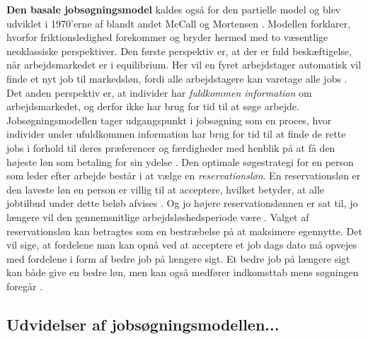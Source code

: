 \textbf{Den basale jobsøgningsmodel} kaldes også for den partielle model og blev udviklet i 1970'erne af blandt andet McCall og Mortensen \parencite[109]{Cahuc2004}. Modellen forklarer, hvorfor friktionsledighed forekommer og bryder hermed med to væsentlige neoklassiske perspektiver. Den første perspektiv er, at der er fuld beskæftigelse, når arbejdsmarkedet er i equilibrium. Her vil en fyret arbejdstager automatisk vil finde et nyt job til markedsløn, fordi alle arbejdstagere kan varetage alle jobs \parencite[163]{Mankiw2007}. Det anden perspektiv er, at individer har \textit{fuldkommen information} om arbejdsmarkedet, og derfor ikke har brug for tid til at søge arbejde. Jobsøgningsmodellen tager udgangspunkt i jobsøgning som en proces, hvor individer under ufuldkommen information har brug for tid til at finde de rette jobs i forhold til deres præferencer og færdigheder med henblik på at få den højeste løn som betaling for sin ydelse \parencite[108]{Cahuc2004}. Den optimale søgestrategi for en person som leder efter arbejde består i at vælge en \textit{reservationsløn}. En reservationsløn er den laveste løn en person er villig til at acceptere, hvilket betyder, at alle jobtilbud under dette beløb afvises \parencite[114]{McCall1970}. Og jo højere reservationslønnen er sat til, jo længere vil den gennemsnitlige arbejdsløshedsperiode være \parencite[848]{Mortensen1970}. %
Valget af reservationsløn kan betragtes som en bestræbelse på at maksimere egennytte. Det vil sige, at fordelene man kan opnå ved at acceptere et job dags dato må opvejes med fordelene i form af bedre job på længere sigt. Et bedre job på længere sigt kan både give en bedre løn, men kan også medfører indkomsttab mens søgningen foregår \parencite[1698]{Atkinson1991}.


\subsection{Udvidelser af jobsøgningsmodellen...}

